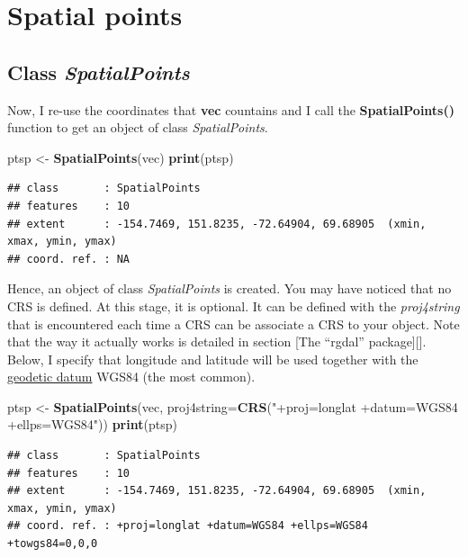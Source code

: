 \documentclass[]{report}
\newenvironment{Shaded}{\begin{snugshade}}{\end{snugshade}}
\newcommand{\DataTypeTok}[1]{\textcolor[rgb]{0.13,0.29,0.53}{#1}}
\newcommand{\KeywordTok}[1]{\textcolor[rgb]{0.13,0.29,0.53}{\textbf{#1}}}
\newcommand{\NormalTok}[1]{#1}
\newcommand{\StringTok}[1]{\textcolor[rgb]{0.31,0.60,0.02}{#1}}
\begin{document}
\hypertarget{spatial-points}{%
\section{Spatial points}\label{spatial-points}}

\hypertarget{class-spatialpoints}{%
\subsection{\texorpdfstring{Class
\emph{SpatialPoints}}{Class SpatialPoints}}\label{class-spatialpoints}}

Now, I re-use the coordinates that \textbf{vec} countains and I call the
\textbf{SpatialPoints()} function to get an object of class
\emph{SpatialPoints}.

\begin{Shaded}
\begin{Highlighting}[]
\NormalTok{ptsp <-}\StringTok{ }\KeywordTok{SpatialPoints}\NormalTok{(vec)}
\KeywordTok{print}\NormalTok{(ptsp)}
\end{Highlighting}
\end{Shaded}

\begin{verbatim}
## class       : SpatialPoints 
## features    : 10 
## extent      : -154.7469, 151.8235, -72.64904, 69.68905  (xmin, xmax, ymin, ymax)
## coord. ref. : NA
\end{verbatim}

Hence, an object of class \emph{SpatialPoints} is created. You may have
noticed that no CRS is defined. At this stage, it is optional. It can be
defined with the \emph{proj4string} that is encountered each time a CRS
can be associate a CRS to your object. Note that the way it actually
works is detailed in section {[}The ``rgdal'' package{]}{[}{]}. Below, I
specify that longitude and latitude will be used together with the
\href{http://en.wikipedia.org/wiki/Geodetic_datum}{geodetic datum} WGS84
(the most common).

\begin{Shaded}
\begin{Highlighting}[]
\NormalTok{ptsp <-}\StringTok{ }\KeywordTok{SpatialPoints}\NormalTok{(vec, }\DataTypeTok{proj4string=}\KeywordTok{CRS}\NormalTok{(}\StringTok{"+proj=longlat +datum=WGS84 +ellps=WGS84"}\NormalTok{))}
\KeywordTok{print}\NormalTok{(ptsp)}
\end{Highlighting}
\end{Shaded}

\begin{verbatim}
## class       : SpatialPoints 
## features    : 10 
## extent      : -154.7469, 151.8235, -72.64904, 69.68905  (xmin, xmax, ymin, ymax)
## coord. ref. : +proj=longlat +datum=WGS84 +ellps=WGS84 +towgs84=0,0,0
\end{verbatim}
\end{document}
